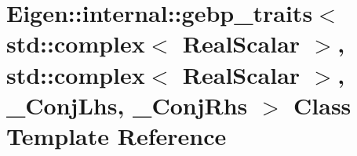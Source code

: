 \hypertarget{class_eigen_1_1internal_1_1gebp__traits_3_01std_1_1complex_3_01_real_scalar_01_4_00_01std_1_1com3fbe501975c876a010def81ad2701521}{}\section{Eigen\+:\+:internal\+:\+:gebp\+\_\+traits$<$ std\+:\+:complex$<$ Real\+Scalar $>$, std\+:\+:complex$<$ Real\+Scalar $>$, \+\_\+\+Conj\+Lhs, \+\_\+\+Conj\+Rhs $>$ Class Template Reference}
\label{class_eigen_1_1internal_1_1gebp__traits_3_01std_1_1complex_3_01_real_scalar_01_4_00_01std_1_1com3fbe501975c876a010def81ad2701521}
